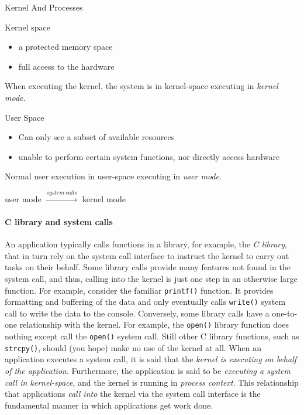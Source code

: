 \begin{frame}{Kernel And Processes}
  \begin{block}{Kernel space}
    \begin{itemize}
    \item a protected memory space
    \item full access to the hardware
    \end{itemize}
    When executing the kernel, the system is in kernel-space executing in \emph{kernel
      mode}.
  \end{block}
  \begin{block}{User Space}
    \begin{itemize}
    \item Can only see a subset of available resources
    \item unable to perform certain system functions, nor directly access hardware
    \end{itemize}
    Normal user execution in user-space executing in \emph{user mode}.
  \end{block}
  \begin{center}
    user mode $\xrightarrow{system\ calls}$ kernel mode
  \end{center}
\end{frame}

\begin{frame}
  \begin{center}
  \end{center}
\end{frame}

\paragraph{C library and system calls}

An application typically calls functions in a library, for example, the \emph{C library},
that in turn rely on the system call interface to instruct the kernel to carry out tasks
on their behalf. Some library calls provide many features not found in the system call,
and thus, calling into the kernel is just one step in an otherwise large function. For
example, consider the familiar \texttt{printf()} function. It provides formatting and
buffering of the data and only eventually calls \texttt{write()} system call to write the
data to the console. Conversely, some library calls have a one-to-one relationship with
the kernel. For example, the \texttt{open()} library function does nothing except call the
\texttt{open()} system call. Still other C library functions, such as \texttt{strcpy()},
should (you hope) make no use of the kernel at all. When an application executes a system
call, it is said that the \emph{kernel is executing on behalf of the
  application}. Furthermore, the application is said to be \emph{executing a system call
  in kernel-space}, and the kernel is running in \emph{process context}. This relationship
that applications \emph{call into} the kernel via the system call interface is the
fundamental manner in which applications get work done. 

